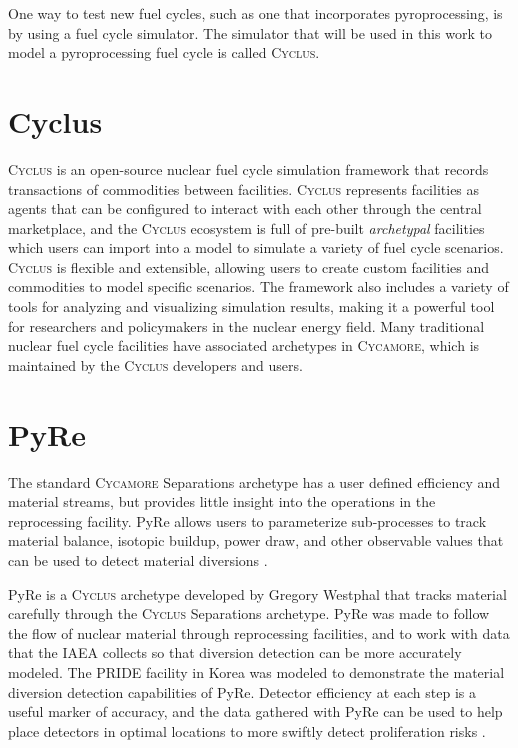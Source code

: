 \documentclass{anstrans}
\newcommand{\cycamore}{\textsc{Cycamore}\xspace}
\newcommand{\cyclus}{\textsc{Cyclus}\xspace}
\begin{document}
One way to test new fuel cycles, such as one that incorporates pyroprocessing, is by using a fuel cycle simulator. The simulator that will be used in this work to model a pyroprocessing fuel cycle is called \cyclus.

\section{Cyclus}
\label{sec:cyclus}
\cyclus \cite{huff_cyclus_intro_2016} is an open-source nuclear fuel cycle simulation framework that records transactions of commodities between facilities. \cyclus represents facilities as agents that can be configured to interact with each other through the central marketplace, and the \cyclus ecosystem is full of pre-built \textit{archetypal} facilities which users can import into a model to simulate a variety of fuel cycle scenarios. \cyclus is flexible and extensible, allowing users to create custom facilities and commodities to model specific scenarios. The framework also includes a variety of tools for analyzing and visualizing simulation results, making it a powerful tool for researchers and policymakers in the nuclear energy field. Many traditional nuclear fuel cycle facilities have associated archetypes in \cycamore \cite{Carlsen_cycamore_2014}, which is maintained by the \cyclus developers and users.

\section{PyRe}
The standard \cycamore Separations archetype has a user defined efficiency and material streams, but provides little insight into the operations in the reprocessing facility. PyRe allows users to parameterize sub-processes to track material balance, isotopic buildup, power draw, and other observable values that can be used to detect material diversions \cite{westphal_modeling_2019}.

PyRe is a \cyclus archetype developed by Gregory Westphal that tracks material carefully through the \cyclus Separations archetype. PyRe was made to follow the flow of nuclear material through reprocessing facilities, and to work with data that the IAEA collects so that diversion detection can be more accurately modeled. The PRIDE facility in Korea was modeled to demonstrate the material diversion detection capabilities of PyRe. Detector efficiency at each step is a useful marker of accuracy, and the data gathered with PyRe can be used to help place detectors in optimal locations to more swiftly detect proliferation risks \cite{westphal_pyre_2018}.
\end{document}
